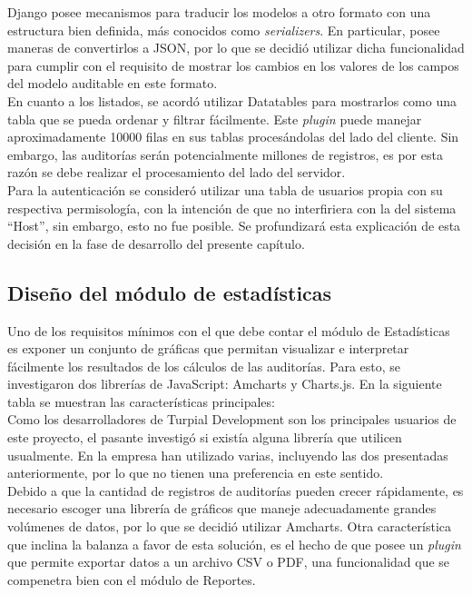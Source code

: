 Django posee mecanismos para traducir los modelos a otro formato con una estructura bien definida, más conocidos como \textit{serializers}. En particular, posee maneras de convertirlos a JSON, por lo que se decidió utilizar dicha funcionalidad para cumplir con el requisito de mostrar los cambios en los valores de los campos del modelo auditable en este formato.\\

En cuanto a los listados, se acordó utilizar Datatables para mostrarlos como una tabla que se pueda ordenar y filtrar fácilmente. Este \textit{plugin} puede manejar aproximadamente 10000 filas en sus tablas procesándolas del lado del cliente. Sin embargo, las auditorías serán potencialmente millones de registros, es por esta razón se debe realizar el procesamiento del lado del servidor. \\

Para la autenticación se consideró utilizar una tabla de usuarios propia con su respectiva permisología, con la intención de que no interfiriera con la del sistema “Host”, sin embargo, esto no fue posible. Se profundizará esta explicación de esta decisión en la fase de desarrollo del presente capítulo.

\subsection{Diseño del módulo de estadísticas}

Uno de los requisitos mínimos con el que debe contar el módulo de Estadísticas es exponer un conjunto de gráficas que permitan visualizar e interpretar fácilmente los resultados de los cálculos de las auditorías. Para esto, se investigaron dos librerías de JavaScript: Amcharts y Charts.js. En la siguiente tabla se muestran las características principales:\\



Como los desarrolladores de Turpial Development son los principales usuarios de este proyecto, el pasante investigó si existía alguna librería que utilicen usualmente. En la empresa han utilizado varias, incluyendo las dos presentadas anteriormente, por lo que no tienen una preferencia en este sentido. \\

Debido a que la cantidad de registros de auditorías pueden crecer rápidamente, es necesario escoger una librería de gráficos que maneje adecuadamente grandes volúmenes de datos, por lo que se decidió utilizar Amcharts. Otra característica que inclina la balanza a favor de esta solución, es el hecho de que posee un \textit{plugin} que permite exportar datos a un archivo CSV o PDF, una funcionalidad que se compenetra bien con el módulo de Reportes. \\

